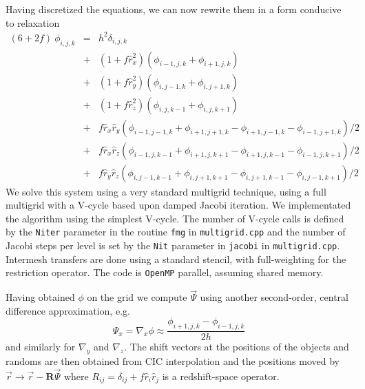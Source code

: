 \documentclass[a4paper,11pt]{article}
\begin{document}
Having discretized the equations, we can now rewrite them in a form
conducive to relaxation
\begin{eqnarray}
  (6+2f)\ \phi_{i,j,k} &=& h^2 \delta_{i,j,k} \nonumber \\
  &+&(1+f\hat{r}_x^2)\left( \phi_{i-1,j,k}+\phi_{i+1,j,k} \right) \nonumber \\
  &+&(1+f\hat{r}_y^2)\left( \phi_{i,j-1,k}+\phi_{i,j+1,k} \right) \nonumber \\
  &+&(1+f\hat{r}_z^2)\left( \phi_{i,j,k-1}+\phi_{i,j,k+1} \right) \nonumber \\
  &+&f\hat{r}_x\hat{r}_y\left( \phi_{i-1,j-1,k}+\phi_{i+1,j+1,k}
                              -\phi_{i+1,j-1,k}-\phi_{i-1,j+1,k} \right)/2
      \nonumber \\
  &+&f\hat{r}_x\hat{r}_z\left( \phi_{i-1,j,k-1}+\phi_{i+1,j,k+1}
                              -\phi_{i+1,j,k-1}-\phi_{i-1,j,k+1} \right)/2
      \nonumber \\
  &+&f\hat{r}_y\hat{r}_z\left( \phi_{i,j-1,k-1}+\phi_{i,j+1,k+1}
                              -\phi_{i,j+1,k-1}-\phi_{i,j-1,k+1} \right)/2
\end{eqnarray}
We solve this system using a very standard multigrid technique, using a full
multigrid with a V-cycle based upon damped Jacobi iteration.
We implementated the algorithm using the simplest V-cycle.
The number of V-cycle calls is defined by the {\tt Niter} parameter in
the routine {\tt fmg} in {\tt multigrid.cpp} and the number of Jacobi
steps per level is set by the {\tt Nit} parameter in {\tt jacobi} in
{\tt multigrid.cpp}.
Intermesh transfers are done using a standard stencil, with full-weighting
for the restriction operator.
The code is {\tt OpenMP} parallel, assuming shared memory.

Having obtained $\phi$ on the grid we compute $\vec{\Psi}$ using another
second-order, central difference approximation, e.g.
\begin{equation}
  \Psi_x = \nabla_x\phi \approx \frac{\phi_{i+1,j,k}-\phi_{i-1,j,k}}{2h}
\end{equation}
and similarly for $\nabla_y$ and $\nabla_z$.  The shift vectors at the
positions of the objects and randoms are then obtained from CIC interpolation
and the positions moved by $\vec{r}\to\vec{r}-\mathbf{R}\vec{\Psi}$ where
$R_{ij}=\delta_{ij}+f\hat{r}_i\hat{r}_j$ is a redshift-space operator.



\end{document}
